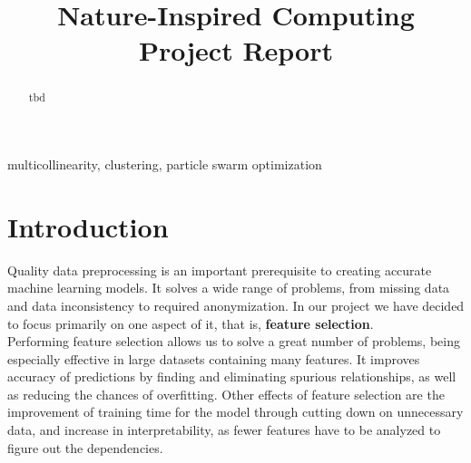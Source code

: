 \documentclass[conference]{IEEEtran}
\begin{document}
\title{Nature-Inspired Computing\\Project Report\\}

\author{
\and
{}
\and
{}
}

\maketitle

\begin{abstract}
tbd
\end{abstract}

\begin{IEEEkeywords}
multicollinearity, clustering, particle swarm optimization
\end{IEEEkeywords}

\section{Introduction}
Quality data preprocessing is an important prerequisite to creating accurate machine learning models. It solves a wide range of problems, from missing data and data inconsistency to required anonymization. In our project we have decided to focus primarily on one aspect of it, that is, \textbf{feature selection}. \\

Performing feature selection allows us to solve a great number of problems, being especially effective in large datasets containing many features. It improves accuracy of predictions by finding and eliminating spurious relationships, as well as reducing the chances of overfitting. Other effects of feature selection are the improvement of training time for the model through cutting down on unnecessary data, and increase in interpretability, as fewer features have to be analyzed to figure out the dependencies. \\
\end{document}
